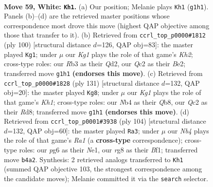 \documentclass[11pt]{article}
\begin{document}
\clearpage

\begin{figure}[p]\centering
\begin{subfigure}{0.46\textwidth}\centering
\resizebox{\linewidth}{!}{%
\newchessgame
\chessboard[
  setfen={rn1qk1r1/4n1b1/6p1/3p2P1/1N1P1P1p/1R5P/1BQ1B2R/6K1 w - - 7 59},
  showmover=false,
  pgfstyle=straightmove, color=movearrow, markmove={g1-h1}
]}
\caption{}
\end{subfigure}\hfill
\begin{subfigure}{0.46\textwidth}\centering
\resizebox{\linewidth}{!}{%
\newchessgame
\chessboard[
  setfen={5r1k/3n2r1/1p1p3q/2nP3p/PR2pP2/4N1P1/3QB1RK/8 w - - 1 51},
  showmover=false,
  pgfstyle=straightmove, color=movearrow, markmove={h2-g1}
]}
\caption{}
\end{subfigure}
\\[4pt]
\begin{subfigure}{0.46\textwidth}\centering
\resizebox{\linewidth}{!}{%
\newchessgame
\chessboard[
  setfen={1q1r3k/1b2r1p1/p3p1Bp/P1P1Np1P/1p6/1P4P1/4R1PK/5Q2 b - - 0 66},
  showmover=false,
  pgfstyle=straightmove, color=movearrow, markmove={h8-g8}
]}
\caption{}
\end{subfigure}\hfill
\begin{subfigure}{0.46\textwidth}\centering
\resizebox{\linewidth}{!}{%
\newchessgame
\chessboard[
  setfen={b1q1rnk1/5pp1/1p5p/1Pn1p3/2P4P/6P1/1B2QP2/R3NBK1 w - - 5 53},
  showmover=false,
  pgfstyle=straightmove, color=movearrow, markmove={a1-a3}
]}
\caption{}
\end{subfigure}
\caption{\textbf{Move 59, White: \texttt{Kh1}.} (a) Our position; Melanie plays \texttt{Kh1} (\texttt{g1h1}). Panels (b)--(d) are the retrieved master positions whose correspondence most drove this move (highest QAP objective among those that transfer to it). (b) Retrieved from \texttt{ccrl\_top\_p0000\#1812} (ply 100) [structural distance $d$=126, QAP obj=83]: the master played \texttt{Kg1}; under $\mu$ our \emph{Kg1} plays the role of that game's \emph{Kh2}; cross-type roles: our \emph{R}b3 as their \emph{Q}d2, our \emph{Q}c2 as their \emph{B}e2; transferred move \texttt{g1h1} \textbf{(endorses this move)}. (c) Retrieved from \texttt{ccrl\_top\_p0000\#1828} (ply 131) [structural distance $d$=132, QAP obj=20]: the master played \texttt{Kg8}; under $\mu$ our \emph{Kg1} plays the role of that game's \emph{Kh1}; cross-type roles: our \emph{N}b4 as their \emph{Q}b8, our \emph{Q}c2 as their \emph{R}d8; transferred move \texttt{g1h1} \textbf{(endorses this move)}. (d) Retrieved from \texttt{ccrl\_top\_p0001\#3938} (ply 104) [structural distance $d$=132, QAP obj=60]: the master played \texttt{Ra3}; under $\mu$ our \emph{Nb4} plays the role of that game's \emph{Ra1} (a \textbf{cross-type} correspondence); cross-type roles: our \emph{p}g6 as their \emph{N}e1, our \emph{r}g8 as their \emph{B}f1; transferred move \texttt{b4a2}. Synthesis: 2 retrieved analogs transferred to \texttt{Kh1} (summed QAP objective 103, the strongest correspondence among the candidate moves); Melanie committed it via the \texttt{search} selector.}
\label{fig:thought-m116}
\end{figure}
\end{document}
